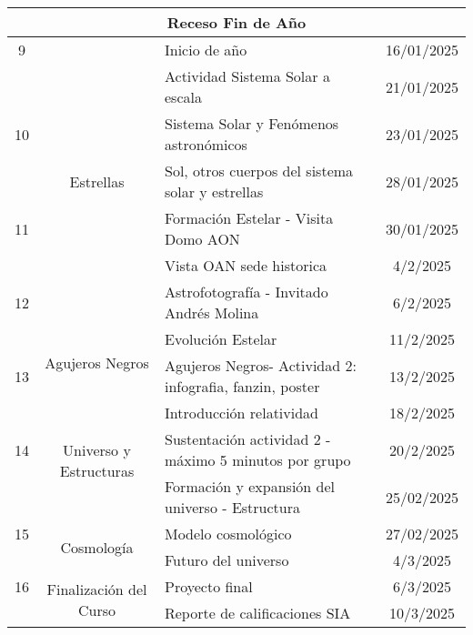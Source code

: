 \documentclass[12pt]{article}
\begin{document}
\begin{table}[p]
\begin{tabular}{|c|c|p{20em}|c|}
       \hline
       \multicolumn{4}{|c|}{\textbf{Receso Fin de Año}} \\
       \hline
       9  & \multirow{7}{*}{Estrellas} & \cellcolor[rgb]{ .969,  .78,  .675}Inicio de año & 16/01/2025 \\
       \cline{1-1}\cline{3-4}       &                           & \cellcolor[rgb]{ .651,  .788,  .925}Actividad Sistema Solar a escala & 21/01/2025 \\
       10 &                           & Sistema Solar y Fenómenos astronómicos & 23/01/2025 \\
       \cline{1-1}\cline{3-4}       &                           & Sol, otros cuerpos del sistema solar y estrellas & 28/01/2025 \\
       11 &                           & Formación Estelar - Visita Domo AON & 30/01/2025 \\
       \cline{1-1}\cline{3-4}       &                           & \cellcolor[rgb]{ .651,  .788,  .925}Vista OAN sede historica & 4/2/2025 \\
       12 &                           & Astrofotografía - Invitado Andrés Molina & 6/2/2025 \\
       \hline
         & \multirow{2}{*}{Agujeros Negros} & Evolución Estelar & 11/2/2025 \\
       13 &                           & \cellcolor[rgb]{ .651,  .788,  .925}Agujeros Negros- Actividad 2: infografia, fanzin, poster & 13/2/2025 \\
       \hline
          & \multirow{3}{*}{Universo y Estructuras} & Introducción relatividad & 18/2/2025 \\
       14 &                           & \cellcolor[rgb]{ .651,  .788,  .925}Sustentación actividad 2 - máximo 5 minutos por grupo & 20/2/2025 \\
       \cline{1-1}\cline{3-4}       &                           & Formación y expansión del universo - Estructura & 25/02/2025 \\
       \cline{2-4}    15 & \multirow{2}{*}{Cosmología} & Modelo cosmológico & 27/02/2025 \\
       \cline{1-1}       &                           & Futuro del universo & 4/3/2025 \\
       \cline{2-4}    16 & \multirow{2}{*}{Finalización del Curso} & \cellcolor[rgb]{ 1,  1,  0}Proyecto final & 6/3/2025 \\
       \cline{1-1}\cline{3-4}       &                           & Reporte de calificaciones SIA & 10/3/2025 \\
       \hline
   \end{tabular}
   \label{tab:contenido_semanal}
\end{table}
\end{document}

